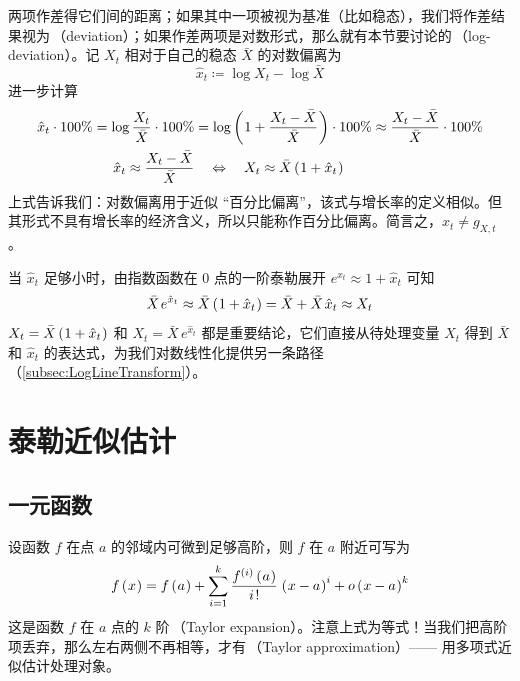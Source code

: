 两项作差得它们间的距离；如果其中一项被视为基准（比如稳态），我们将作差结果视为\,（deviation）；如果作差两项是对数形式，那么就有本节要讨论的\,（log-deviation）。记 \(X_t\) 相对于自己的稳态 \(\bar X\) 的对数偏离为
\begin{equation}
    \hat x_t\coloneq \log X_t-\log\bar X\label{eq:HatDef}
\end{equation}
进一步计算
\begin{align}
    \hat x_t\cdot100\%=\operatorname{log}\frac{X_t}{\bar X}\cdot100\%&=\operatorname{log}\left(\mspace{1mu}1+\frac{X_t-\bar X}{\bar X}\mspace{1mu}\right)\cdot100\%\approx \frac{X_t-\bar X}{\bar X}\cdot100\%\notag\\
    \hat x_t\approx \dfrac{X_t-\bar X}{\bar X} &\quad\Leftrightarrow\quad X_t\approx \bar X\left(\mspace{1mu}1+\hat x_t\mspace{1mu}\right)
    \label{eq:HatPercent}
\end{align}
上式告诉我们：对数偏离用于近似 “百分比偏离”，该式与增长率的定义相似。但其形式不具有增长率的经济含义，所以只能称作百分比偏离。简言之，\(\hat x_t\ne g_{X,t}\,\)。

当 \(\hat x_t\) 足够小时，由指数函数在 0 点的一阶泰勒展开 \(e^{\hat x_t}\approx 1+\hat x_t\) 可知
\begin{equation}
    \bar X\,e^{\hat x_t}\approx\bar X\bka{1+\hat x_t}=\bar X+\bar X\,\hat x_t\approx X_t
    \label{eq:LevelFromHat}
\end{equation}
\(X_t=\bar X\left(\mspace{1mu}1+\hat x_t\mspace{1mu}\right)\) 和 \(X_t=\bar X\,e^{\hat x_t}\) 都是重要结论，它们直接从待处理变量 \(X_t\) 得到 \(\bar X\) 和 \(\hat x_t\) 的表达式，为我们对数线性化提供另一条路径（\ref{subsec:LogLineTransform}）。

\section{泰勒近似估计}\label{sec:TaylorApprox}

\subsection{一元函数}\label{subsec:TaylorOneVar}

设函数 \(f\) 在点 \(a\) 的邻域内可微到足够高阶，则 \(f\) 在 \(a\) 附近可写为
\begin{equation}
    f\bka{x}=f\bka{a}+\sum_{i=1}^{k}\frac{f^{(i)}\bka{a}}{i\,!}\,\bka{x-a}^{i}+o\bka{x-a}^{k}
\end{equation}
这是函数 \(f\) 在 \(a\) 点的 \(k\) 阶\,（Taylor expansion）。注意上式为等式！当我们把高阶项丢弃，那么左右两侧不再相等，才有\,（Taylor approximation）—— 用多项式近似估计处理对象。

